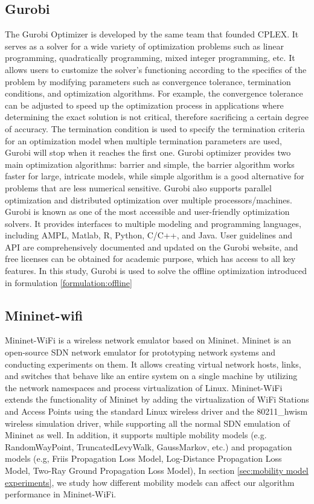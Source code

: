 \subsection{Gurobi}
The Gurobi Optimizer \cite{gurobi} is developed by the same team that founded CPLEX\cite{CPLEX}. It serves as a solver for a wide variety of optimization problems such as linear programming, quadratically programming, mixed integer programming, etc. 
It allows users to customize the solver's functioning according to the specifics of the problem by modifying parameters such as convergence tolerance, termination conditions, and optimization algorithms. For example, the convergence tolerance can be adjusted to speed up the optimization process in applications where determining the exact solution is not critical, therefore sacrificing a certain degree of accuracy. The termination condition is used to specify the termination criteria for an optimization model when multiple termination parameters are used, Gurobi will stop when it reaches the first one. Gurobi optimizer provides two main optimization algorithms: barrier and simple, the barrier algorithm works faster for large, intricate models, while simple algorithm is a good alternative for problems that are less numerical sensitive. Gurobi also supports parallel optimization and distributed optimization over multiple processors/machines. Gurobi is known as one of the most accessible and user-friendly optimization solvers. It provides interfaces to multiple modeling and programming languages, including AMPL, Matlab, R, Python, C/C++, and Java. User guidelines and API are comprehensively documented and updated on the Gurobi website, and free licenses can be obtained for academic purpose, which has access to all key features. In this study, Gurobi is used to solve the offline optimization introduced in formulation \ref{formulation:offline}


\subsection{Mininet-wifi}
Mininet-WiFi \cite{miniwifipaper} is a wireless network emulator based on Mininet\cite{team2012mininet}. Mininet is an open-source SDN network emulator for prototyping network systems and conducting experiments on them. It allows creating virtual network hosts, links, and switches that behave like an entire system on a single machine by utilizing the network namespaces and process virtualization of Linux. Mininet-WiFi extends the functionality of Mininet by adding the virtualization of WiFi Stations and Access Points using the standard Linux wireless driver and the 80211\_hwism wireless simulation driver, while supporting all the normal SDN emulation of Mininet as well. In addition, it supports multiple mobility models (e.g. RandomWayPoint, TruncatedLevyWalk, GaussMarkov, etc.) and propagation models (e.g, Friis Propagation Loss Model, Log-Distance Propagation Loss Model, Two-Ray Ground Propagation Loss Model), In section \ref{sec:mobility model experiments}, we study how different mobility models can affect our algorithm performance in Mininet-WiFi. 

